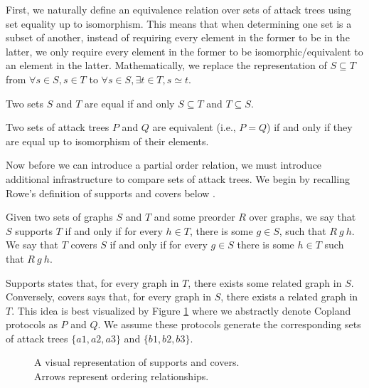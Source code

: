 \documentclass[runningheads]{llncs}
\theoremstyle{definition}
\begin{document}
First, we naturally define an equivalence relation over sets of attack trees using set equality up to isomorphism. This means that when determining one set is a subset of another, instead of requiring every element in the former to be in the latter, we only require every element in the former to be isomorphic/equivalent to an element in the latter. Mathematically, we replace the representation of $S \subseteq T$ from $\forall s \in S, s \in T$ to $\forall s \in S, \exists t \in T, s \simeq t$.

\begin{definition}
  Two sets $S$ and $T$ are equal if and only $S \subseteq T$ and $T \subseteq S$.
\end{definition}

\begin{definition}[Equivalence =]
    Two sets of attack trees $P$ and $Q$ are equivalent (i.e., $P = Q$) if and only if they are equal up to isomorphism of their elements.
\end{definition}

Now before we can introduce a partial order relation, we must introduce additional infrastructure to compare sets of attack trees. We begin by recalling Rowe's definition of supports and covers below \cite{Rowe:2021:OnOrdering}.

\begin{definition}
    Given two sets of graphs $S$ and $T$ and some preorder $R$ over graphs, we say that $S$ supports $T$ if and only if for every $h \in T$, there is some $g \in S$, such that $R\: g\: h$. We  say that $T$ covers $S$ if and only if for every $g \in S$ there is some $h \in T$ such that $R\: g\: h$.
\end{definition}

Supports states that, for every graph in $T$, there exists some related graph in $S$. Conversely, covers says that, for every graph in $S$, there exists a related graph in $T$.  This idea is best visualized by Figure \ref{fig:sup-cov} where we abstractly denote Copland protocols as $P$ and $Q$. We assume these protocols generate the corresponding sets of attack trees $\{a1, a2 , a3 \}$ and $ \{b1, b2 ,b3\}$.

\begin{figure}[htbp]
    \centering
    
    \captionsetup{justification=centering,margin=1cm}
    \caption[Supports and covers]{A visual representation of supports and covers. \\ Arrows represent ordering relationships.}
    \label{fig:sup-cov}
\end{figure}
\end{document}
